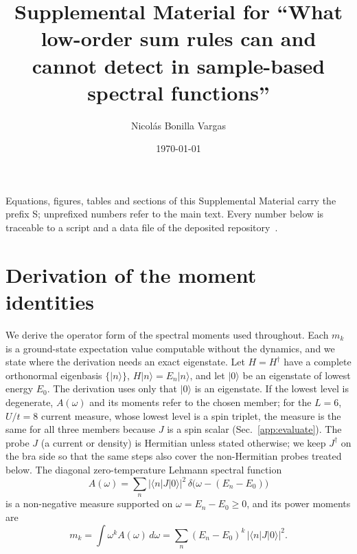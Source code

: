 \documentclass[aps,prb,onecolumn,superscriptaddress,longbibliography,floatfix]{revtex4-2}
\begin{document}
\title{Supplemental Material for ``What low-order sum rules can and cannot detect in sample-based spectral functions''}
\author{Nicol\'as Bonilla Vargas}
\date{\today}
\maketitle

\noindent Equations, figures, tables and sections of this Supplemental Material carry the prefix S; unprefixed numbers refer to the main text. Every number below is traceable to a script and a data file of the deposited repository~\cite{P3zenodo}.
\section{Derivation of the moment identities}
\label{app:moments}
We derive the operator form of the spectral moments used throughout. Each $m_k$ is a ground-state expectation value computable without the dynamics, and we state where the derivation needs an exact eigenstate. Let $H=H^\dagger$ have a complete orthonormal eigenbasis $\{|n\rangle\}$, ${H|n\rangle=E_n|n\rangle}$, and let $|0\rangle$ be an eigenstate of lowest energy $E_0$. The derivation uses only that $|0\rangle$ is an eigenstate. If the lowest level is degenerate, $A(\omega)$ and its moments refer to the chosen member; for the $L=6$, $U/t=8$ current measure, whose lowest level is a spin triplet, the measure is the same for all three members because $J$ is a spin scalar (Sec.~\ref{app:evaluate}). The probe $J$ (a current or density) is Hermitian unless stated otherwise; we keep $J^\dagger$ on the bra side so that the same steps also cover the non-Hermitian probes treated below. The diagonal zero-temperature Lehmann spectral function
\begin{equation}
A(\omega)=\sum_n |\langle n|J|0\rangle|^2\,\delta\!\big(\omega-(E_n-E_0)\big)
\label{eq:app-lehmann}
\end{equation}
is a non-negative measure supported on $\omega=E_n-E_0\ge 0$, and its power moments are
\[
m_k=\int\omega^k A(\omega)\,d\omega=\sum_n(E_n-E_0)^k\,|\langle n|J|0\rangle|^2 .
\]
\end{document}
